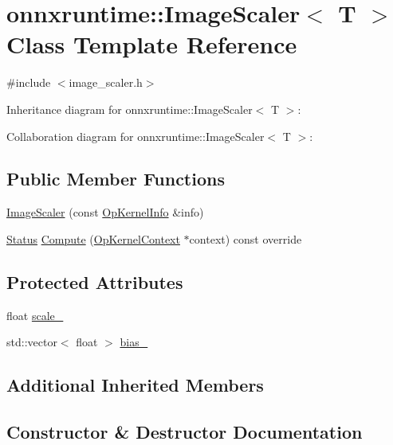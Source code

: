 \hypertarget{classonnxruntime_1_1ImageScaler}{}\section{onnxruntime\+:\+:Image\+Scaler$<$ T $>$ Class Template Reference}
\label{classonnxruntime_1_1ImageScaler}


{\ttfamily \#include $<$image\+\_\+scaler.\+h$>$}



Inheritance diagram for onnxruntime\+:\+:Image\+Scaler$<$ T $>$\+:


Collaboration diagram for onnxruntime\+:\+:Image\+Scaler$<$ T $>$\+:
\subsection*{Public Member Functions}
\begin{DoxyCompactItemize}
\item 
\mbox{\hyperlink{classonnxruntime_1_1ImageScaler_ad2f31b891202d651182be9af28eff3dd}{Image\+Scaler}} (const \mbox{\hyperlink{classonnxruntime_1_1OpKernelInfo}{Op\+Kernel\+Info}} \&info)
\item 
\mbox{\hyperlink{classonnxruntime_1_1common_1_1Status}{Status}} \mbox{\hyperlink{classonnxruntime_1_1ImageScaler_ab6b04f35b90a54f27093b7915fe3f2a1}{Compute}} (\mbox{\hyperlink{classonnxruntime_1_1OpKernelContext}{Op\+Kernel\+Context}} $\ast$context) const override
\end{DoxyCompactItemize}
\subsection*{Protected Attributes}
\begin{DoxyCompactItemize}
\item 
float \mbox{\hyperlink{classonnxruntime_1_1ImageScaler_a43010f6839787f7fd46ae8ece2d363aa}{scale\+\_\+}}
\item 
std\+::vector$<$ float $>$ \mbox{\hyperlink{classonnxruntime_1_1ImageScaler_aefdecedc355195cb19ccdb2db452fe33}{bias\+\_\+}}
\end{DoxyCompactItemize}
\subsection*{Additional Inherited Members}


\subsection{Constructor \& Destructor Documentation}
\mbox{\label{classonnxruntime_1_1ImageScaler_ad2f31b891202d651182be9af28eff3dd}} 
